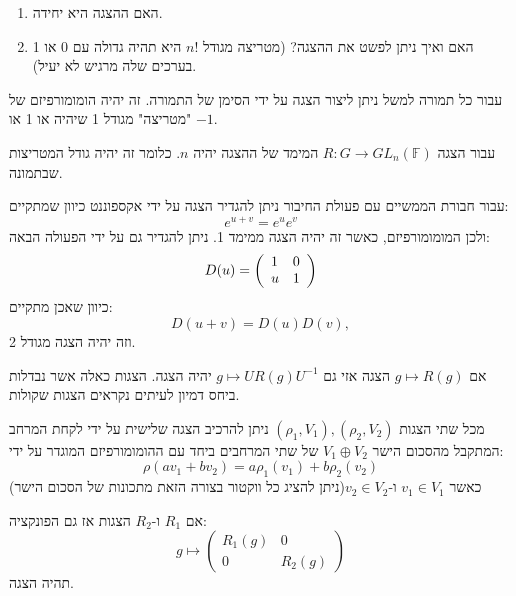 \documentclass{tstextbook}
\begin{document}
\begin{enumerate}
  \item האם ההצגה היא יחידה. 


  \item האם ואיך ניתן לפשט את ההצגה? (מטריצה מגודל \(n!\) היא תהיה גדולה עם 0 או 1 בערכים שלה מרגיש לא יעיל). 


\end{enumerate}
\begin{example}
עבור כל תמורה למשל ניתן ליצור הצגה על ידי הסימן של התמורה. זה יהיה הומומורפיזם של "מטריצה" מגודל 1 שיהיה או 1 או \(-1\).

\end{example}
\begin{definition}
עבור הצגה \(R:G\to GL_{n}\left( \mathbb{F}  \right)\) המימד של ההצגה יהיה \(n\). כלומר זה יהיה גודל המטריצות שבתמונה.

\end{definition}
\begin{example}
עבור חבורת הממשיים עם פעולת החיבור ניתן להגדיר הצגה על ידי אקספוננט כיוון שמתקיים:
$$e^{ u+v }=e^{ u }e^{ v }$$
ולכן המומומורפיזם, כאשר זה יהיה הצגה ממימד 1. ניתן להגדיר גם על ידי הפעולה הבאה:
$$D(u)=\left(\begin{array}{l l}{{1}}&{{0}}\\ {{u}}&{{1}}\end{array}\right)$$
כיוון שאכן מתקיים:
$$D(u+v)=D(u)D(v),$$
וזה יהיה הצגה מגודל 2.

\end{example}
\begin{proposition}
אם \(g\mapsto R(g)\) הצגה אזי גם \(g\mapsto UR(g)U^{-1}\) יהיה הצגה. הצגות כאלה אשר נבדלות ביחס דמיון לעיתים נקראים הצגות שקולות.

\end{proposition}
\begin{proposition}
מכל שתי הצגות \(\left( \rho_{1},V_{1} \right),\left( \rho_{2},V_{2} \right)\) ניתן להרכיב הצגה שלישית על ידי לקחת המרחב המתקבל מהסכום הישר \(V_{1} \oplus V_{2}\) של שתי המרחבים ביחד עם ההומומורפיזם המוגדר על ידי:
$$\rho(av_{1}+bv_{2})=a\rho_{1}(v_{1})+b\rho_{2}(v_{2})$$
כאשר \(v_{1} \in V_{1}\) ו-\(v_{2} \in V_{2}\)(ניתן להציג כל ווקטור בצורה הזאת מתכונות של הסכום הישר)

\end{proposition}
\begin{corollary}
אם \(R_{1}\) ו-\(R_{2}\) הצגות אז גם הפונקציה:
$$g \mapsto \begin{pmatrix}R_{1}(g) & 0 \\0 & R_{2}(g)
\end{pmatrix}$$
תהיה הצגה.

\end{corollary}
\end{document}
